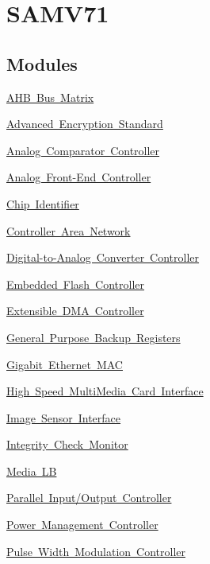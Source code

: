 \hypertarget{group__RTEMSBSPsARMAtsamContribV71}{}\section{S\+A\+M\+V71}
\label{group__RTEMSBSPsARMAtsamContribV71}
\subsection*{Modules}
\begin{DoxyCompactItemize}
\item 
\mbox{\hyperlink{group__SAMV71__MATRIX}{A\+H\+B Bus Matrix}}
\item 
\mbox{\hyperlink{group__SAMV71__AES}{Advanced Encryption Standard}}
\item 
\mbox{\hyperlink{group__SAMV71__ACC}{Analog Comparator Controller}}
\item 
\mbox{\hyperlink{group__SAMV71__AFEC}{Analog Front-\/\+End Controller}}
\item 
\mbox{\hyperlink{group__SAMV71__CHIPID}{Chip Identifier}}
\item 
\mbox{\hyperlink{group__SAMV71__MCAN}{Controller Area Network}}
\item 
\mbox{\hyperlink{group__SAMV71__DACC}{Digital-\/to-\/\+Analog Converter Controller}}
\item 
\mbox{\hyperlink{group__SAMV71__EFC}{Embedded Flash Controller}}
\item 
\mbox{\hyperlink{group__SAMV71__XDMAC}{Extensible D\+M\+A Controller}}
\item 
\mbox{\hyperlink{group__SAMV71__GPBR}{General Purpose Backup Registers}}
\item 
\mbox{\hyperlink{group__SAMV71__GMAC}{Gigabit Ethernet M\+AC}}
\item 
\mbox{\hyperlink{group__SAMV71__HSMCI}{High Speed Multi\+Media Card Interface}}
\item 
\mbox{\hyperlink{group__SAMV71__ISI}{Image Sensor Interface}}
\item 
\mbox{\hyperlink{group__SAMV71__ICM}{Integrity Check Monitor}}
\item 
\mbox{\hyperlink{group__SAMV71__MLB}{Media LB}}
\item 
\mbox{\hyperlink{group__SAMV71__PIO}{Parallel Input/\+Output Controller}}
\item 
\mbox{\hyperlink{group__SAMV71__PMC}{Power Management Controller}}
\item 
\mbox{\hyperlink{group__SAMV71__PWM}{Pulse Width Modulation Controller}}

\end{DoxyCompactItemize}
